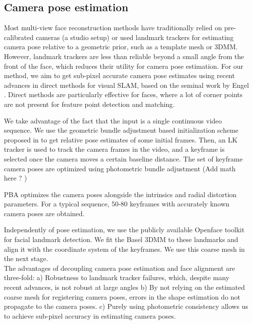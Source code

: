 \documentclass[10pt,twocolumn,letterpaper]{article}
\begin{document}
\subsection{Camera pose estimation} \label{sec:PBA}
Most multi-view face reconstruction methods have traditionally relied on pre-calibrated cameras (a studio setup) or used landmark trackers for estimating camera pose relative to a geometric prior, such as a template mesh or 3DMM. However, landmark trackers are less than reliable beyond a small angle from the front of the face, which reduces their utility for camera pose estimation. For our method, we aim to get sub-pixel accurate camera pose estimates using recent advances in direct methods for visual SLAM, based on the seminal work by Engel \etal \cite{engel2018direct,engel2014lsd}. Direct methods are particularly effective for faces, where a lot of corner points are not present for feature point detection and matching.

We take advantage of the fact that the input is a single continuous video sequence. We use the geometric bundle adjustment based initialization scheme proposed in \cite{ham2017monocular} to get relative pose estimates of some initial frames. Then, an LK tracker is used to track the camera frames in the video, and a keyframe is selected once the camera moves a certain baseline distance. The set of keyframe camera poses are optimized using photometric bundle adjustment (Add math here ? ) 


PBA optimizes the camera poses alongside the intrinsics and radial distortion parameters. For a typical sequence, 50-80 keyframes with accurately known camera poses are obtained.


Independently of pose estimation, we use the publicly available Openface toolkit \cite{baltrusaitis2018openface} for facial landmark detection. We fit the Basel 3DMM \cite{blanz1999morphable} to these landmarks and align it with the coordinate system of the keyframes. We use this coarse mesh in the next stage. \\

The advantages of decoupling camera pose estimation and face alignment are three-fold: a) Robustness to landmark tracker failures, which, despite many recent advances, is not robust at large angles  b) By not relying on the estimated coarse mesh for registering camera poses, errors in the shape estimation do not propagate to the camera poses. c) Purely using photometric consistency allows us to achieve sub-pixel accuracy in estimating camera poses. 
\end{document}
